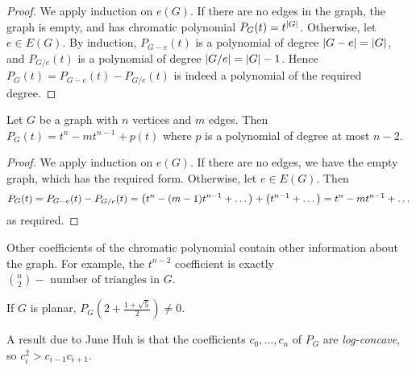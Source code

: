 \begin{proof}
	We apply induction on \( e(G) \).
	If there are no edges in the graph, the graph is empty, and has chromatic polynomial \( P_G(t) = t^{\abs{G}} \).
	Otherwise, let \( e \in E(G) \).
	By induction, \( P_{G - e}(t) \) is a polynomial of degree \( \abs{G - e} = \abs{G} \), and \( P_{G / e}(t) \) is a polynomial of degree \( \abs{G / e} = \abs{G} - 1 \).
	Hence \( P_G(t) = P_{G - e}(t) - P_{G / e}(t) \) is indeed a polynomial of the required degree.
\end{proof}
\begin{proposition}
	Let \( G \) be a graph with \( n \) vertices and \( m \) edges.
	Then \( P_G(t) = t^n - mt^{n-1} + p(t) \) where \( p \) is a polynomial of degree at most \( n - 2 \).
\end{proposition}
\begin{proof}
	We apply induction on \( e(G) \).
	If there are no edges, we have the empty graph, which has the required form.
	Otherwise, let \( e \in E(G) \).
	Then
	\[ P_G(t) = P_{G - e}(t) - P_{G/e}(t) = \qty(t^n - (m - 1)t^{n-1} + \dots) + \qty(t^{n-1} + \dots) = t^n - mt^{n-1} + \dots \]
	as required.
\end{proof}
\begin{remark}
	Other coefficients of the chromatic polynomial contain other information about the graph.
	For example, the \( t^{n-2} \) coefficient is exactly \( \binom n 2 - \text{ number of triangles in } G \).

	If \( G \) is planar, \( P_G(2+\frac{1+\sqrt{5}}{2}) \neq 0 \).

	A result due to June Huh is that the coefficients \( c_0, \dots, c_n \) of \( P_G \) are \emph{log-concave}, so \( c_i^2 > c_{i-1}c_{i+1} \).
\end{remark}

